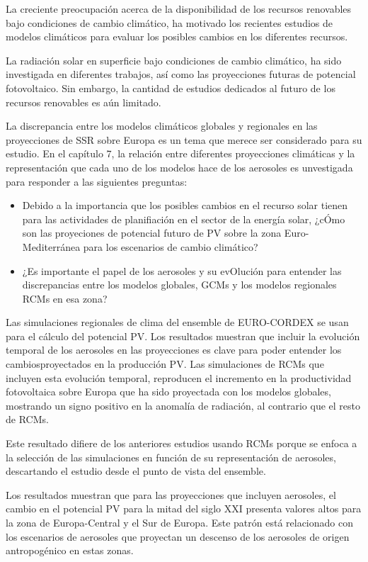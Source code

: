 La creciente preocupación acerca de la disponibilidad de los recursos renovables bajo condiciones de cambio climático, ha motivado los recientes estudios de modelos climáticos para evaluar los posibles cambios en los diferentes recursos.

La radiación solar en superficie bajo condiciones de cambio climático, ha sido investigada en diferentes trabajos, así como las proyecciones futuras de potencial fotovoltaico. Sin embargo, la cantidad de estudios dedicados al futuro de los recursos renovables es aún limitado.

La discrepancia entre los modelos climáticos globales y regionales en las proyecciones de SSR sobre Europa es un tema que merece ser considerado para su estudio. En el capítulo 7, la relación entre diferentes proyecciones climáticas y la representación que cada uno de los modelos hace de los aerosoles es unvestigada para responder a las siguientes preguntas:

\begin{itemize}
\item Debido a la importancia que los posibles cambios en el recurso solar tienen para las actividades de planifiación en el sector de la energía solar, ¿cÓmo son las proyeciones de potencial futuro de PV sobre la zona Euro-Mediterránea para los escenarios de cambio climático?
\item ¿Es importante el papel de los aerosoles y su evOlución para entender las discrepancias entre los modelos globales, GCMs y los modelos regionales RCMs en esa zona?
\end{itemize}

Las simulaciones regionales de clima del ensemble de EURO-CORDEX se usan para el cálculo del potencial PV. Los resultados muestran que incluir la evolución temporal de los aerosoles en las proyecciones es clave para poder entender los cambiosproyectados en la producción PV. Las simulaciones de RCMs que incluyen esta evolución temporal, reproducen el incremento en la productividad fotovoltaica sobre Europa que ha sido proyectada con los modelos globales, mostrando un signo positivo en la anomalía de radiación, al contrario que el resto de RCMs.

Este resultado difiere de los anteriores estudios usando RCMs porque se enfoca a la selección de las simulaciones en función de su representación de aerosoles, descartando el estudio desde el punto de vista del ensemble.

Los resultados muestran que para las proyecciones que incluyen aerosoles, el cambio en el potencial PV para la mitad del siglo XXI presenta valores altos para la zona de Europa-Central y el Sur de Europa. Este patrón está relacionado con los escenarios de aerosoles que proyectan un descenso de los aerosoles de origen antropogénico en estas zonas.


